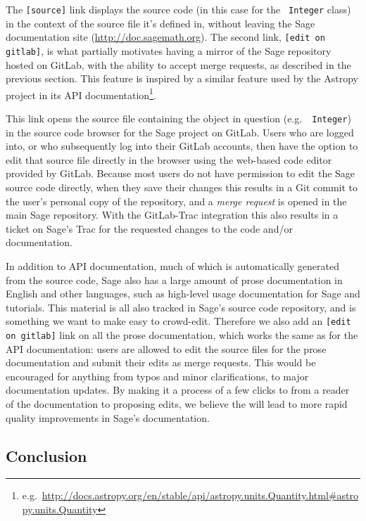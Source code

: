 {The {\tt [source]} link displays the source code (in this case for the {\tt
Integer} class)  in the context of the source file it's defined in, without
leaving the Sage documentation site (\url{http://doc.sagemath.org}).  The
second link, {\tt [edit on gitlab]}, is what partially motivates having a
mirror of the Sage repository hosted on GitLab, with the ability to accept
merge requests, as described in the previous section.  This feature is inspired
by a similar feature used by the Astropy project in its API
documentation\footnote{e.g.~\url{http://docs.astropy.org/en/stable/api/astropy.units.Quantity.html\#astropy.units.Quantity}}.

This link opens the source file containing the object in question (e.g.~{\tt
Integer}) in the source code browser for the Sage project on GitLab.  Users
who are logged into, or who subsequently log into their GitLab accounts, then
have the option to edit that source file directly in the browser using the
web-based code editor provided by GitLab.  Because most users do not have
permission to edit the Sage source code directly, when they save their changes
this results in a Git commit to the user's personal copy of the repository,
and a {\em merge request} is opened in the main Sage repository.  With the
GitLab-Trac integration this also results in a ticket on Sage's Trac for the
requested changes to the code and/or documentation.

In addition to API documentation, much of which is automatically generated from
the source code, Sage also has a large amount of prose documentation in English
and other languages, such as high-level usage documentation for Sage and
tutorials.  This material is all also tracked in Sage's source code repository,
and is something we want to make easy to crowd-edit.  Therefore we also add an
{\tt [edit on gitlab]} link on all the prose documentation, which works the
same as for the API documentation: users are allowed to edit the source files
for the prose documentation and submit their edits as merge requests.  This
would be encouraged for anything from typos and minor clarifications, to
major documentation updates.  By making it a process of a few clicks to from
a reader of the documentation to proposing edits, we believe the will lead
to more rapid quality improvements in Sage's documentation.


\hypertarget{conclusion}{%
\subsection{Conclusion}\label{conclusion}}

}
